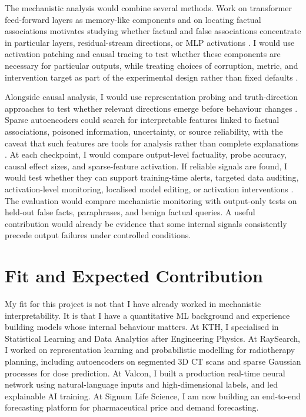 \documentclass[10pt,a4paper]{article}
\begin{document}
\hspace*{2em}
The mechanistic analysis would combine several methods. Work on transformer feed-forward layers as memory-like components and on locating factual associations motivates studying whether factual and false associations concentrate in particular layers, residual-stream directions, or MLP activations \cite{geva2021transformer,meng2022locating}. I would use activation patching and causal tracing to test whether these components are necessary for particular outputs, while treating choices of corruption, metric, and intervention target as part of the experimental design rather than fixed defaults \cite{meng2022locating,zhang2024activationpatching}.

\hspace*{2em}
Alongside causal analysis, I would use representation probing and truth-direction approaches to test whether relevant directions emerge before behaviour changes \cite{burns2022discovering}. Sparse autoencoders could search for interpretable features linked to factual associations, poisoned information, uncertainty, or source reliability, with the caveat that such features are tools for analysis rather than complete explanations \cite{templeton2026scaling}. At each checkpoint, I would compare output-level factuality, probe accuracy, causal effect sizes, and sparse-feature activation. If reliable signals are found, I would test whether they can support training-time alerts, targeted data auditing, activation-level monitoring, localised model editing, or activation interventions \cite{li2023inference,meng2022locating}. The evaluation would compare mechanistic monitoring with output-only tests on held-out false facts, paraphrases, and benign factual queries. A useful contribution would already be evidence that some internal signals consistently precede output failures under controlled conditions.

\section{Fit and Expected Contribution}
My fit for this project is not that I have already worked in mechanistic interpretability. It is that I have a quantitative ML background and experience building models whose internal behaviour matters. At KTH, I specialised in Statistical Learning and Data Analytics after Engineering Physics. At RaySearch, I worked on representation learning and probabilistic modelling for radiotherapy planning, including autoencoders on segmented 3D CT scans and sparse Gaussian processes for dose prediction. At Valcon, I built a production real-time neural network using natural-language inputs and high-dimensional labels, and led explainable AI training. At Signum Life Science, I am now building an end-to-end forecasting platform for pharmaceutical price and demand forecasting.
\end{document}
